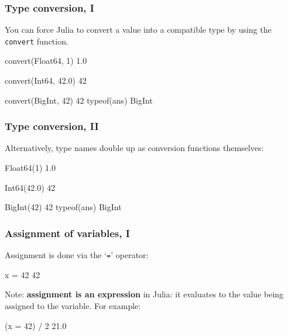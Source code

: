 \documentclass[english,serif,mathserif,xcolor=pdftex,dvipsnames,table]{beamer}
\begin{document}
\begin{frame}[fragile]
  \frametitle{Type conversion, I}
  You can force Julia to convert a value into a compatible type by
  using the \texttt{convert} function.

  \+ %
\begin{semiverbatim}
\julia convert(Float64, 1)
1.0

\julia convert(Int64, 42.0)
42

\julia convert(BigInt, 42)
42
\julia typeof(ans)
BigInt
\end{semiverbatim}
\end{frame}


\begin{frame}[fragile]
  \frametitle{Type conversion, II}
  Alternatively, type names double up as conversion functions themselves:

  \+ %
\begin{semiverbatim}
\julia Float64(1)
1.0

\julia Int64(42.0)
42

\julia BigInt(42)
42
\julia typeof(ans)
BigInt
\end{semiverbatim}
\end{frame}






\begin{frame}
  \frametitle{Assignment of variables, I}
  Assignment is done via the `\texttt{=}' operator:
\begin{semiverbatim}
\julia x = 42
42
\end{semiverbatim}

  \+ Note: \textbf{assignment is an expression} in Julia: it evaluates
  to the value being assigned to the variable.  For example:
\begin{semiverbatim}
\julia (x = 42) / 2
21.0
\end{semiverbatim}
\end{frame}
\end{document}
